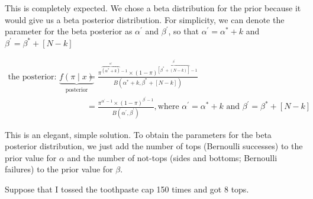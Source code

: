 \documentclass[
]{book}
\begin{document}
This is completely expected. We chose a beta distribution for the prior
because it would give us a beta posterior distribution. For simplicity,
we can denote the parameter for the beta posterior as \(\alpha^\prime\)
and \(\beta^\prime\), so that \(\alpha^\prime = \alpha^* + k\) and
\(\beta^\prime = \beta^* + [N - k]\)

\[
\begin{aligned}
\text{the posterior: } \displaystyle \underbrace{f(\pi \mid x)}_{\text{posterior}} &= \frac{ \pi^{\overbrace{(\alpha^* + k)}^{\alpha^\prime} - 1}  \times  (1 - \pi)^{\overbrace{[\beta^* + (N - k)]}^{\beta^\prime} - 1}  }{ B(\alpha^* + k, \beta^* + [N - k])} \\
&= \frac{ \pi^{\alpha^\prime - 1}  \times  (1 - \pi)^{\beta^\prime - 1}  }{ B(\alpha^\prime, \beta^\prime)}, \text{where } \alpha^\prime = \alpha^* + k \text{ and } \beta^\prime = \beta^* + [N - k]
\end{aligned}
\]

This is an elegant, simple solution. To obtain the parameters for the
beta posterior distribution, we just add the number of tops (Bernoulli
successes) to the prior value for \(\alpha\) and the number of not-tops
(sides and bottoms; Bernoulli failures) to the prior value for
\(\beta\).

Suppose that I tossed the toothpaste cap 150 times and got 8 tops.
\end{document}
